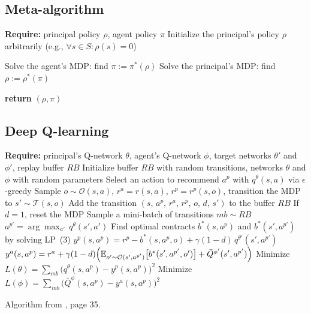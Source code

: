 \documentclass{article}
\theoremstyle{plain}
\theoremstyle{definition}
\theoremstyle{remark}
\begin{document}
\subsection{Meta-algorithm}
\begin{algorithm}
  \caption{Meta-algorithm for finding SPE}
  \label{alg:spe-meta}
  \begin{algorithmic}
    \STATE \textbf{Require:} principal policy $\rho$, agent policy $\pi$
    \STATE Initialize the principal’s policy $\rho$ arbitrarily (e.g., $\forall s \in S: \rho(s) = 0$)
    
      \STATE Solve the agent’s MDP: find $\pi := \pi^{*}(\rho)$
      \STATE Solve the principal’s MDP: find $\rho := \rho^{*}(\pi)$
    \ENDWHILE
    
    \STATE \textbf{return} $(\rho, \pi)$
  \end{algorithmic}
\end{algorithm}


\subsection{Deep Q-learning}
\begin{algorithm}[H]
  \caption{Deep Q-learning}
  \label{alg:deep-q}
  \begin{algorithmic}
    \STATE \textbf{Require:} principal's Q-network $\theta$, agent's Q-network 
    $\phi$, target networks $\theta'$ and $\phi'$, replay buffer $RB$
    \STATE Initialize buffer $RB$ with random transitions, networks $\theta$ 
    and $\phi$ with random parameters
        \STATE Select an action to recommend $a^p$ with $q^{\theta}(s,a)$ 
        via $\epsilon$-greedy
        \STATE Sample $o \sim \mathcal{O}(s,a)$,\; $r^a = r(s,a)$,\; 
        $r^p = r^p(s,o)$,\; transition the MDP to $s' \sim \mathcal{T}(s,o)$
        \STATE Add the transition $(s,\,a^p,\,r^a,\,r^p,\,o,\,d,\,s')$ 
        to the buffer $RB$
        \STATE If $d=1$, reset the MDP
      \ENDFOR
      \STATE Sample a mini-batch of transitions $mb \sim RB$
        \STATE $a^{p'} = \arg\max_{a'}\, q^{\theta}(s',a')$
        \STATE Find optimal contracts $b^*(s,a^p)$ and $b^*(s',a^{p'})$ 
        by solving LP~(3)
        \STATE $y^p(s,a^p) = r^p - b^*(s,a^p,o) 
        + \gamma(1-d)\,q^{\theta'}(s',a^{p'})$
        \STATE $y^a(s,a^p) = r^a + \gamma(1-d)
        \Bigl(\mathbb{E}_{o' \sim \mathcal{O}(s',a^{p'})}\bigl[b^*(s',a^{p'},o')\bigr] 
        + \bar{Q}^{\phi'}(s',a^{p'})\Bigr)$
      \ENDFOR
      \STATE Minimize $L(\theta) = 
      \displaystyle\sum_{mb}\!\bigl(q^{\theta}(s,a^p)-y^p(s,a^p)\bigr)^2$
      \STATE Minimize $L(\phi) = 
      \displaystyle\sum_{mb}\!\bigl(\bar{Q}^{\phi}(s,a^p)-y^a(s,a^p)\bigr)^2$
    \ENDFOR
  \end{algorithmic}
\end{algorithm}
Algorithm from \cite{ivanov2024principal}, page 35.
\end{document}
